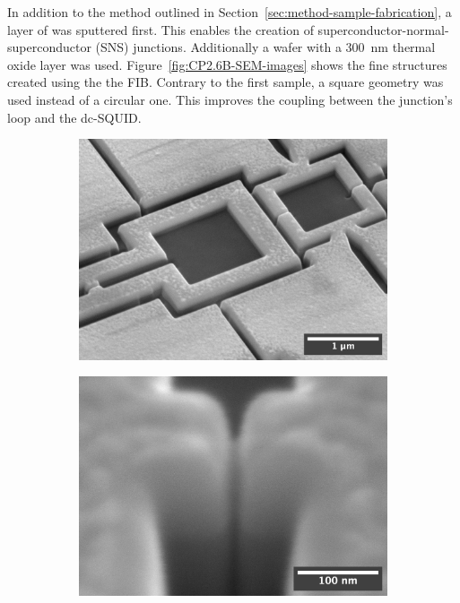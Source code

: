 In addition to the method outlined in Section~\ref{sec:method-sample-fabrication}, a layer of  was sputtered first. This enables the creation of superconductor-normal-superconductor (SNS) junctions. Additionally a  wafer with a \qty{300}{\nano\meter} thermal oxide layer was used. Figure~\ref{fig:CP2.6B-SEM-images} shows the fine structures created using the the FIB. Contrary to the first sample, a square geometry was used instead of a circular one. This improves the coupling between the junction's loop and the dc-SQUID.

\begin{figure}[ht!]
	\begin{subfigure}[t]{0.3\textwidth}
		\centering
		\includegraphics[width=\textwidth]{figures/samples/CP2/CP2.6B_SEM_overview.jpg}
	\end{subfigure}
	\hfill
	\begin{subfigure}[t]{0.3\textwidth}
		\centering
		\includegraphics[width=\textwidth]{figures/samples/CP2/CP2.6B_SEM_junction.jpg}

\end{subfigure}
\end{figure}
